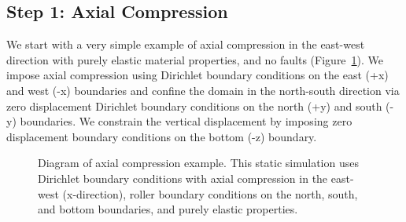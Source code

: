 \subsection{Step 1: Axial Compression}
\label{sec:example:subduction:3d:step01}

We start with a very simple example of axial compression in the
east-west direction with purely elastic material properties, and no
faults (Figure~\ref{fig:example:subduction:3d:step01:diagram}). We
impose axial compression using Dirichlet boundary conditions on the
east (+x) and west (-x) boundaries and confine the domain in the
north-south direction via zero displacement Dirichlet boundary
conditions on the north (+y) and south (-y) boundaries.  We constrain
the vertical displacement by imposing zero displacement boundary
conditions on the bottom (-z) boundary.

\begin{figure}[htbp]
  \caption{Diagram of axial compression example. This static
    simulation uses Dirichlet boundary conditions with axial
    compression in the east-west (x-direction), roller boundary
    conditions on the north, south, and bottom boundaries, and purely
    elastic properties.}
  \label{fig:example:subduction:3d:step01:diagram}
\end{figure}

